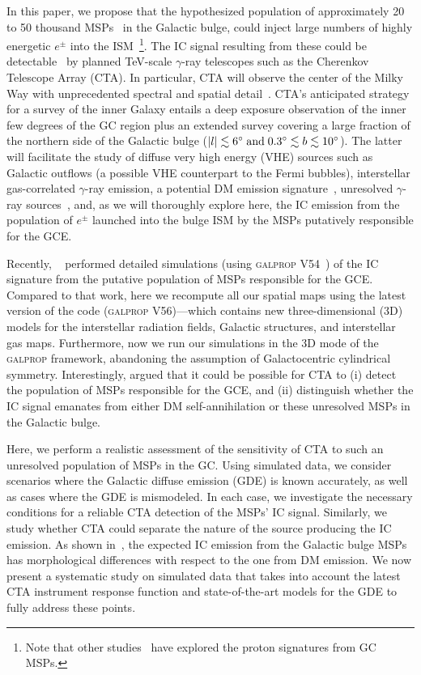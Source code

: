 \documentclass[doublespace,draft,nopageskip]{VTthesis} %
\begin{document}
In this paper, we propose that the hypothesized population of approximately 20 to 50 thousand MSPs~\citep{Ploeg:2020jeh} in the Galactic bulge, could inject large numbers of highly energetic $e^{\pm}$ into the ISM~\footnote{Note that other studies~\citep[e.g.,][]{Guepin:2018jkb} have explored the proton signatures from GC MSPs.}. The  IC signal resulting from these could be detectable~\citep{Song:2019nrx} by planned TeV-scale $\gamma$-ray telescopes such as 
the Cherenkov Telescope Array (CTA). 
%
In particular, CTA will observe the center of the Milky Way with unprecedented spectral and spatial detail~\citep{CTAConsortium:2018tzg}. 
%
CTA's anticipated strategy for a survey of the inner Galaxy entails a deep exposure observation of the inner few degrees of the GC region plus an extended survey covering a large fraction of the northern side of the Galactic bulge ($|l|\lesssim 6^{\circ}\;{\rm and}\; 0.3^{\circ}\lesssim b \lesssim 10^{\circ}$). The latter will facilitate the study of diffuse very high energy (VHE) sources such as Galactic outflows (a possible VHE counterpart to the Fermi bubbles), interstellar gas-correlated $\gamma$-ray emission, a potential DM emission signature~\citep{Acharyya:2020sbj}, unresolved $\gamma$-ray sources~\citep{Viana:2019jwd}, and, as we will thoroughly explore here, the IC emission from the 
population of $e^\pm$ launched into the bulge ISM by the
 MSPs putatively responsible for the GCE.  



 Recently, ~\cite{Song:2019nrx} performed detailed simulations (using \textsc{galprop} V54~\citealt{Porter:2006tb}) of the IC signature from the putative population of MSPs responsible for the GCE. Compared to that work, here we recompute all our spatial maps using the latest version of the code (\textsc{galprop} V56)---which contains new three-dimensional (3D) models for the interstellar radiation fields, Galactic structures, and interstellar gas maps. Furthermore, now we run our simulations in the 3D mode of the \textsc{galprop} framework, abandoning the assumption of Galactocentric cylindrical symmetry. Interestingly, \cite{Song:2019nrx} argued that it could be possible for CTA to (i) detect the population of MSPs responsible for the GCE, and (ii) distinguish whether the IC signal emanates from either DM self-annihilation or these unresolved MSPs in the Galactic bulge. 
 
 Here, we perform a realistic assessment of the sensitivity of CTA to such an unresolved population of MSPs in the GC. Using simulated data, we consider scenarios where the Galactic diffuse emission (GDE) is known accurately, as well as cases where the GDE is mismodeled. In each case, we investigate the necessary conditions for a reliable CTA detection of the MSPs' IC signal. Similarly, we study whether CTA could separate the nature of the source producing the IC emission. As shown in~\citet{Song:2019nrx}, the expected IC emission from the Galactic bulge MSPs has morphological differences with respect to the one from DM emission. We now present a systematic study on simulated data that takes into account the latest CTA instrument response function and state-of-the-art models for the GDE to fully address these points.
 
\end{document}
